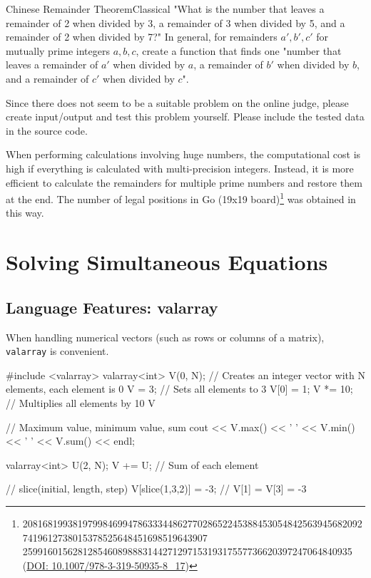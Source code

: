 \begin{versionbeta}
\begin{pbox}{Chinese Remainder Theorem}{Classical}
  "What is the number that leaves a remainder of 2 when divided by 3, a remainder of 3 when divided by 5, and a remainder of 2 when divided by 7?"
In general, for remainders $a',b',c'$ for mutually prime integers $a,b,c$,
  create a function that finds one "number that leaves a remainder of $a'$ when divided by $a$, a remainder of $b'$ when divided by $b$, and a remainder of $c'$ when divided by $c$".

Since there does not seem to be a suitable problem on the online judge, please create input/output and test this problem yourself. Please include the tested data in the source code.
\end{pbox}

When performing calculations involving huge numbers, the computational cost is high if everything is calculated with multi-precision integers. Instead, it is more efficient to calculate the remainders for multiple prime numbers and restore them at the end.
The number of legal positions in Go (19x19 board)\footnote{208168199381979984699478633344862770286522453884530548425639456820927419612738015378525648451698519643907
259916015628128546089888314427129715319317557736620397247064840935 (\url{DOI: 10.1007/978-3-319-50935-8_17})} was obtained in this way.

\section{Solving Simultaneous Equations}

\subsection{Language Features: valarray}

When handling numerical vectors (such as rows or columns of a matrix), \texttt{valarray} is convenient.

\begin{cbox}
#include <valarray>
valarray<int> V(0, N);  // Creates an integer vector with N elements, each element is 0
V = 3; // Sets all elements to 3
V[0] = 1;
V *= 10; // Multiplies all elements by 10
V 

// Maximum value, minimum value, sum
cout << V.max() << ' ' << V.min() << ' ' << V.sum() << endl;

valarray<int> U(2, N);
V += U; // Sum of each element

// slice(initial, length, step)
V[slice(1,3,2)] = -3; // V[1] = V[3] = -3
\end{cbox}


\end{versionbeta}

